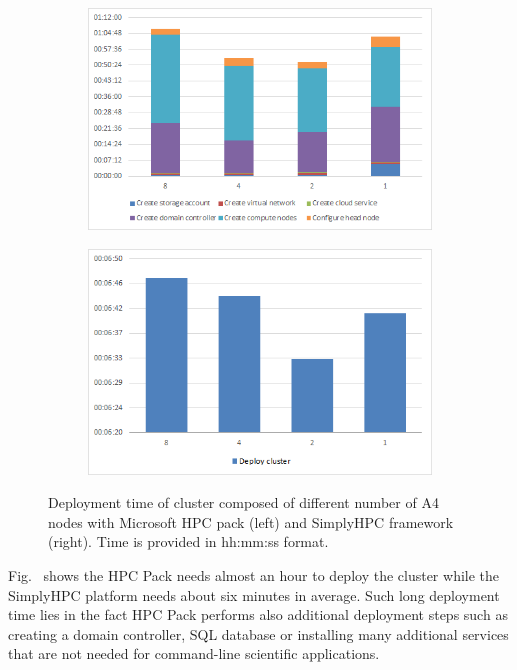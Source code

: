 \documentclass[3p,times]{elsarticle}
\begin{document}
\begin{figure}
\centering
\begin{subfigure}{.5\textwidth}
  \centering
			\includegraphics[width=\linewidth]{hpcDeployTime}	
  \label{fig:hpcgDeploy}
\end{subfigure}%
\begin{subfigure}{.5\textwidth}
  \centering
  \includegraphics[width=\linewidth]{simplyHpcDeployTime}
  \label{fig:simplyHpcDeploy}
\end{subfigure}
\caption{Deployment time of cluster composed of different number of A4 nodes with Microsoft HPC pack (left) and SimplyHPC framework (right). Time is provided in hh:mm:ss format.}
\label{fig:deployTime}
\end{figure}

Fig.~\label{fig:deployTime} shows the HPC Pack needs almost an hour to deploy the cluster while the SimplyHPC platform needs about six minutes in average. Such long deployment time lies in the fact HPC Pack performs also additional deployment steps such as creating a domain controller, SQL database or installing many additional services that are not needed for command-line scientific applications.
\end{document}
